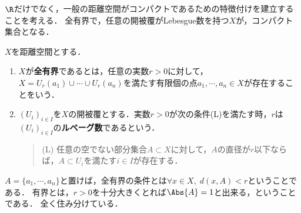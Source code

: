 \documentclass[uplatex,dvipdfmx]{jsreport}
\begin{document}
\begin{tcolorbox}[colframe=ForestGreen, colback=ForestGreen!10!white, breakable ,colbacktitle=ForestGreen!40!white, coltitle=black,fonttitle=\bfseries\sffamily
    ,title=距離空間とコンパクト性]
    $\R$だけでなく，一般の距離空間がコンパクトであるための特徴付けを建立することを考える．
    全有界で，任意の開被覆がLebesgue数を持つ$X$が，コンパクト集合となる．
\end{tcolorbox}

\begin{definition}\label{def-Lebesgue-number}
    $X$を距離空間とする．
    \begin{enumerate}
        \item $X$が\textbf{全有界}であるとは，任意の実数$r>0$に対して，$X=U_r(a_1)\cup\cdots\cup U_r(a_n)$を満たす有限個の点$a_1,\cdots,a_n\in X$が存在することをいう．
        \item $(U_i)_{i\in I}$を$X$の開被覆とする．実数$r>0$が次の条件(L)を満たす時，$r$は$(U_i)_{i\in I}$の\textbf{ルベーグ数}であるという．
        \begin{quote}
            (L) 任意の空でない部分集合$A\subset X$に対して，$A$の直径が$r$以下ならば，$A\subset U_i$を満たす$i\in I$が存在する．
        \end{quote}
    \end{enumerate}
\end{definition}
\begin{remarks}
    $A=\{a_1,\cdots,a_n\}$と置けば，全有界の条件とは$\forall x\in X,\;d(x,A)<r$ということである．
    有界とは，$r>0$を十分大きくとれば$\Abs{A}=1$と出来る，ということである．
    全く住み分けている．
\end{remarks}
\end{document}
